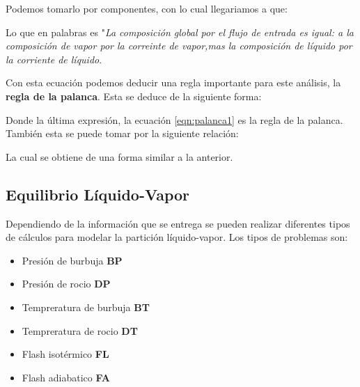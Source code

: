 Podemos tomarlo por componentes, con lo cual llegariamos a que:


Lo que en palabras es "\textit{La composición global por el flujo de entrada es igual: a la composición de vapor por la correinte de vapor,mas la composición de líquido por la corriente de líquido}. 

Con esta ecuación podemos deducir una regla importante para este análisis, la \textbf{regla de la palanca}. Esta se deduce de la siguiente forma:


Donde la última expresión, la ecuación \ref{eqn:palanca1} es la regla de la palanca. También esta se puede tomar por la siguiente relación:


La cual se obtiene de una forma similar a la anterior.

\subsection{Equilibrio Líquido-Vapor}

Dependiendo de la información que se entrega se pueden realizar diferentes tipos de cálculos
para modelar la partición líquido-vapor. Los tipos de problemas son:

\begin{itemize}
    \item Presión de burbuja \textbf{BP}
    \item Presión de rocio \textbf{DP}
    \item Tempreratura de burbuja \textbf{BT}
    \item Tempreratura de rocio \textbf{DT}
    \item Flash isotérmico \textbf{FL}
    \item Flash adiabatico \textbf{FA}
\end{itemize}

